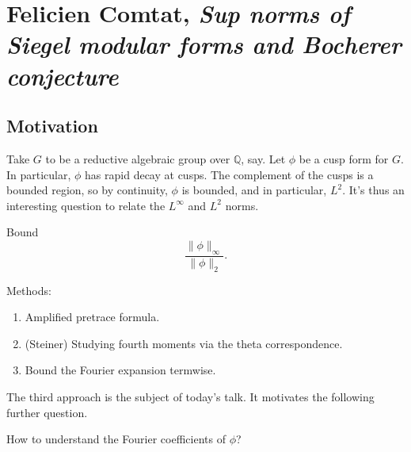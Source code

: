 \documentclass[reqno]{amsart} 
\begin{document}
\section{Felicien Comtat, \emph{Sup norms of Siegel modular forms and Bocherer conjecture}}

\subsection{Motivation}
Take $G$ to be a reductive algebraic group over $\mathbb{Q}$, say.  Let $\phi$ be a cusp form for $G$.  In particular, $\phi$ has rapid decay at cusps.  The complement of the cusps is a bounded region, so by continuity, $\phi$ is bounded, and in particular, $L^2$.  It's thus an interesting question to relate the $L^\infty $ and $L^2 $ norms.
\begin{problem}
  Bound
  \begin{equation*}
    \frac{\lVert \phi  \rVert _\infty }{ \lVert \phi   \rVert_2 }.
  \end{equation*}
\end{problem}

Methods:
\begin{enumerate}
\item Amplified pretrace formula.
\item (Steiner) Studying fourth moments via the theta correspondence.
\item Bound the Fourier expansion termwise.
\end{enumerate}
The third approach is the subject of today's talk.  It motivates the following further question.
\begin{problem}
How to understand the Fourier coefficients of $\phi$?
\end{problem}
\end{document}
